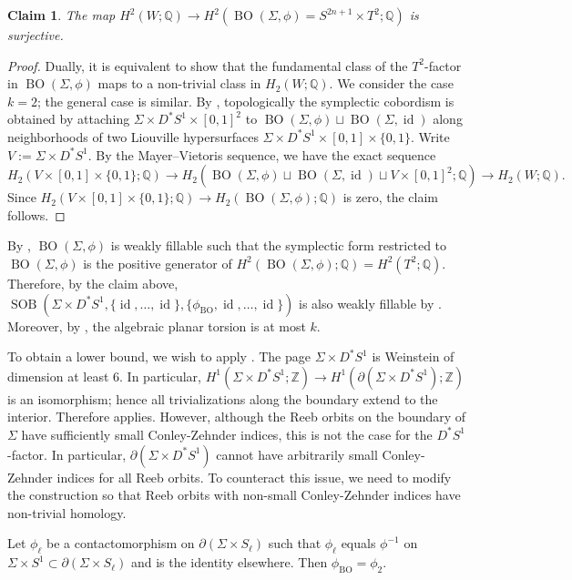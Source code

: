 \documentclass[11pt]{amsart}
\numberwithin{equation}{section}
\newtheorem{claim}[theorem]{\textbf{Claim}}
\def\Z{{\mathbb Z}}
\def\Q{{\mathbb Q}}
\DeclareMathOperator{\Id}{id}
\DeclareMathOperator{\BO}{BO}
\DeclareMathOperator{\SOB}{SOB}
\begin{document}
\begin{claim}\label{claim}
    The map $H^2(W;\Q)\to H^2(\BO(\Sigma,\phi)=S^{2n+1}\times T^2;\Q)$ is surjective.
\end{claim}
\begin{proof}
Dually, it is equivalent to show that the fundamental class of the $T^2$-factor in $\BO(\Sigma,\phi)$ maps to a non-trivial class in $H_2(W;\Q)$. We consider the case $k=2$; the general case is similar. By \cite[\S 4.1]{Russell}, topologically the symplectic cobordism is obtained by attaching $\Sigma \times D^*S^1 \times [0,1]^2$ to $\BO(\Sigma,\phi)\sqcup \BO(\Sigma,\Id)$ along neighborhoods of two Liouville hypersurfaces $\Sigma \times D^*S^1\times [0,1]\times \{0,1\}$. Write $V:=\Sigma \times D^*S^1$. By the Mayer–Vietoris sequence, we have the exact sequence
$$H_2(V \times [0,1]\times \{0,1\};\Q)\to H_2(\BO(\Sigma,\phi)\sqcup \BO(\Sigma,\Id)\sqcup V\times [0,1]^2;\Q)\to H_2(W;\Q).$$
Since $H_2(V \times [0,1]\times \{0,1\};\Q)\to H_2(\BO(\Sigma,\phi);\Q)$ is zero, the claim follows.
\end{proof}

By \cite[Theorem A]{zbMATH07162211}, $\BO(\Sigma,\phi)$ is weakly fillable such that the symplectic form restricted to $\BO(\Sigma,\phi)$ is the positive generator of $H^2(\BO(\Sigma,\phi);\Q)=H^2(T^2;\Q)$. Therefore, by the claim above, $\SOB(\Sigma \times D^*S^1, \{\Id,\ldots,\Id\}, \{\phi_{\BO},\Id,\ldots,\Id\})$ is also weakly fillable by . Moreover, by , the algebraic planar torsion is at most $k$.

To obtain a lower bound, we wish to apply . The page $\Sigma \times D^*S^1$ is Weinstein of dimension at least $6$. In particular, $H^1(\Sigma \times D^*S^1;\Z)\to H^1(\partial(\Sigma \times D^*S^1);\Z)$ is an isomorphism; hence all trivializations along the boundary extend to the interior. Therefore  applies. However, although the Reeb orbits on the boundary of $\Sigma$ have sufficiently small Conley-Zehnder indices, this is not the case for the $D^*S^1$-factor. In particular, $\partial(\Sigma\times D^*S^1)$ cannot have arbitrarily small Conley-Zehnder indices for all Reeb orbits. To counteract this issue, we need to modify the construction so that Reeb orbits with non-small Conley-Zehnder indices have non-trivial homology.

Let $\phi_{\ell}$ be a contactomorphism on $\partial(\Sigma \times S_{\ell})$ such that $\phi_{\ell}$ equals $\phi^{-1}$ on $\Sigma \times S^1\subset \partial(\Sigma \times S_{\ell})$ and is the identity elsewhere. Then $\phi_{\BO}=\phi_2$. 
\end{document}
